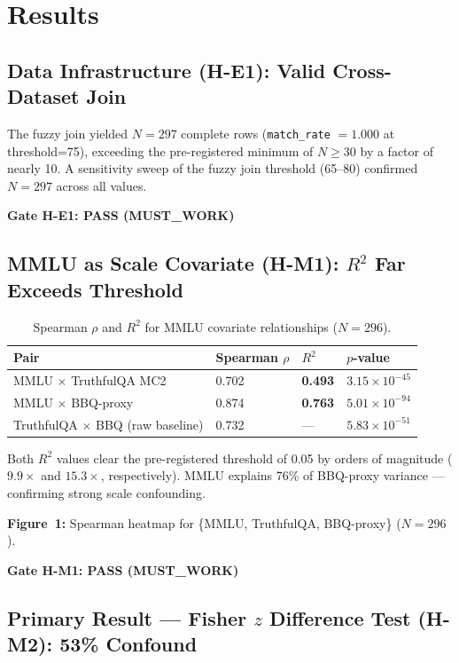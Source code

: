 \section{Results}
\label{sec:results}

\subsection{Data Infrastructure (H-E1): Valid Cross-Dataset Join}

The fuzzy join yielded $N{=}297$ complete rows (\texttt{match\_rate} $= 1.000$ at threshold=75), exceeding the pre-registered minimum of $N \geq 30$ by a factor of nearly 10. A sensitivity sweep of the fuzzy join threshold (65--80) confirmed $N{=}297$ across all values.

\textbf{Gate H-E1: PASS (MUST\_WORK)}

\subsection{MMLU as Scale Covariate (H-M1): $R^2$ Far Exceeds Threshold}

\begin{table}[h]
\centering
\caption{Spearman $\rho$ and $R^2$ for MMLU covariate relationships ($N{=}296$).}
\label{tab:hm1}
\begin{tabular}{@{}llll@{}}
\toprule
Pair & Spearman $\rho$ & $R^2$ & $p$-value \\
\midrule
MMLU $\times$ TruthfulQA MC2    & 0.702 & \textbf{0.493} & $3.15 \times 10^{-45}$ \\
MMLU $\times$ BBQ-proxy          & 0.874 & \textbf{0.763} & $5.01 \times 10^{-94}$ \\
TruthfulQA $\times$ BBQ (raw baseline) & 0.732 & --- & $5.83 \times 10^{-51}$ \\
\bottomrule
\end{tabular}
\end{table}

Both $R^2$ values clear the pre-registered threshold of 0.05 by orders of magnitude ($9.9\times$ and $15.3\times$, respectively). MMLU explains 76\% of BBQ-proxy variance --- confirming strong scale confounding.

\textbf{Figure~1:} Spearman heatmap for \{MMLU, TruthfulQA, BBQ-proxy\} ($N{=}296$).

\textbf{Gate H-M1: PASS (MUST\_WORK)}

\subsection{Primary Result --- Fisher $z$ Difference Test (H-M2): 53\% Confound}

